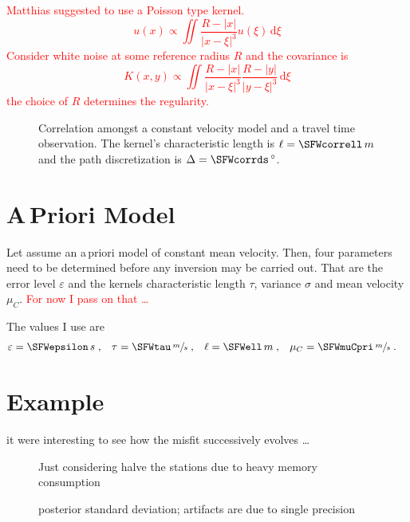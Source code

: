 \documentclass[11pt]{article}
\newcommand\worries[1]{\textcolor{red}{#1}}
\begin{document}
\worries{Matthias suggested to use a Poisson type kernel.
\begin{equation}
    u(x) \propto \iint \frac{R-|x|}{|x-\xi|^3} u(\xi) \, \mathrm d \xi
\end{equation}
Consider white noise at some reference radius $R$ and the covariance is
\begin{equation}
    K(x,y) \propto \iint \frac{R-|x|}{|x-\xi|^3} \frac{R-|y|}{|y-\xi|^3} \, \mathrm d \xi
\end{equation}
the choice of $R$ determines the regularity. }


\begin{figure}
    
    \centering
    
    \caption{Correlation amongst a constant velocity model and a travel time observation.
        The kernel's characteristic length is $\ell=\SFWcorrell\,m$ and the path discretization is $\Delta = \SFWcorrds\,{}^\circ$. }
    \label{fig:correlation}
\end{figure}


\section{A\,Priori Model}

Let assume an a\,priori model of constant mean velocity.
Then, four parameters need to be determined before any inversion may be carried out.
That are the error level $\varepsilon$ and the kernels characteristic length $\tau$, variance $\sigma$ and mean velocity $\mu_C$.
\worries{For now I pass on that \dots }

The values I use are
\begin{align}
    \varepsilon &= \SFWepsilon \, s \;,&
    \tau &= \SFWtau \, \sfrac ms \;,&
    \ell &= \SFWell \, m \;,&
    \mu_C &= \SFWmuCpri \, \sfrac ms \;.
\end{align}


\section{Example}

it were interesting to see how the misfit successively evolves \dots
\begin{figure}
    \centering
    
    \caption{Just considering halve the stations due to heavy memory consumption }
    \label{fig:example_mu}
\end{figure}

\begin{figure}
    \centering
    
    \caption{posterior standard deviation; artifacts are due to single precision }
    \label{fig:example_sd}
\end{figure}
\end{document}
